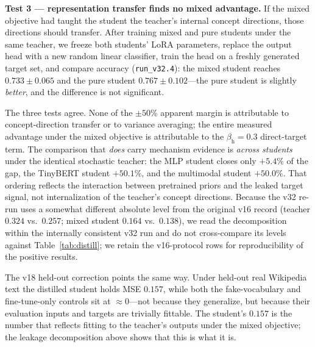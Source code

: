 \documentclass[10pt,twoside]{article}
\theoremstyle{definition}
\theoremstyle{plain}
\theoremstyle{remark}
\begin{document}
\textbf{Test 3 --- representation transfer finds no mixed advantage.} If the mixed objective had taught the student the teacher's internal concept directions, those directions should transfer. After training mixed and pure students under the same teacher, we freeze both students' LoRA parameters, replace the output head with a new random linear classifier, train the head on a freshly generated target set, and compare accuracy (\texttt{run\_v32.4}): the mixed student reaches $0.733 \pm 0.065$ and the pure student $0.767 \pm 0.102$---the pure student is slightly \emph{better}, and the difference is not significant.

The three tests agree. None of the $\pm 50\%$ apparent margin is attributable to concept-direction transfer or to variance averaging; the entire measured advantage under the mixed objective is attributable to the $\beta_{\text{h}}=0.3$ direct-target term. The comparison that \emph{does} carry mechanism evidence is \emph{across students} under the identical stochastic teacher: the MLP student closes only $+5.4\%$ of the gap, the TinyBERT student $+50.1\%$, and the multimodal student $+50.0\%$. That ordering reflects the interaction between pretrained priors and the leaked target signal, not internalization of the teacher's concept directions. Because the v32 re-run uses a somewhat different absolute level from the original v16 record (teacher $0.324$ vs.\ $0.257$; mixed student $0.164$ vs.\ $0.138$), we read the decomposition within the internally consistent v32 run and do not cross-compare its levels against Table~\ref{tab:distill}; we retain the v16-protocol rows for reproducibility of the positive results.

The v18 held-out correction points the same way. Under held-out real Wikipedia text the distilled student holds MSE $0.157$, while both the fake-vocabulary and fine-tune-only controls sit at $\approx 0$---not because they generalize, but because their evaluation inputs and targets are trivially fittable. The student's $0.157$ is the number that reflects fitting to the teacher's outputs under the mixed objective; the leakage decomposition above shows that this is what it is.
\end{document}

